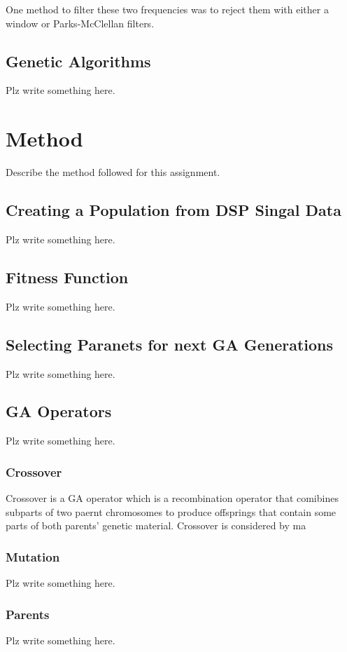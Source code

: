 \documentclass[a4paper, 11pt]{article}
\begin{document}
        One method to filter these two frequencies was to reject them with either a window or Parks-McClellan filters.
        
    \subsection{Genetic Algorithms}\label{sec:bg_sub2}
        Plz write something here.

\section{Method}\label{sec:meth}
    Describe the method followed for this assignment.
    \subsection{Creating a Population from DSP Singal Data}\label{sec:meth_sub1}
        Plz write something here.
    \subsection{Fitness Function}\label{sec:meth_sub2}
        Plz write something here.
    \subsection{Selecting Paranets for next GA Generations}\label{sec:meth_sub3}
        Plz write something here.
    \subsection{GA Operators}\label{sec:meth_sub4}
        Plz write something here.
        \subsubsection{Crossover}
            Crossover is a GA operator which is a recombination operator that comibines subparts of two paernt 
            chromosomes to produce offsprings that contain some parts of both parents' genetic material. Crossover
            is considered by ma
        \subsubsection{Mutation}
            Plz write something here.
        \subsubsection{Parents}
            Plz write something here.
\end{document}
